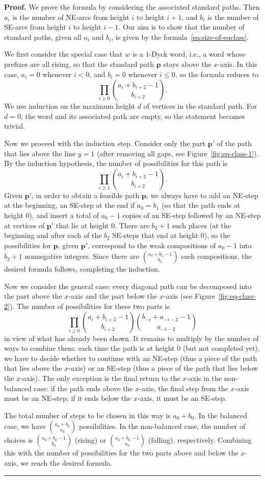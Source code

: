 \documentclass[numbers=enddot,12pt,final,onecolumn,notitlepage]{scrartcl}%
\theoremstyle{definition}
\newenvironment{proof}[1][Proof]{\noindent\textbf{#1.} }{\ \rule{0.5em}{0.5em}}
\newcommand{\pp}{\mathbf{p}}
\begin{document}
\begin{proof}
We prove the formula by considering the associated standard paths. Then $a_i$ is the number of NE-arcs from height $i$ to height $i+1$, and $b_i$ is the number of SE-arcs from height $i$ to height $i-1$. Our aim is to show that the number of standard paths, given all $a_i$ and $b_i$, is given by the formula~\eqref{eq:size-of-eqclass}.

We first consider the special case that $w$ is a $1$-Dyck word, i.e., a word whose prefixes are all rising, so that the standard path $\pp$ stays above the $x$-axis. In this case, $a_i = 0$ whenever $i < 0$, and $b_i = 0$ whenever $i \leq 0$, so the formula reduces to 
\[
\prod_{i \geq 0} \binom{a_i + b_{i+2} - 1}{b_{i+2}}.
\]
We use induction on the maximum height $d$ of vertices in the standard path. For $d=0$, the word and its associated path are empty, so the statement becomes trivial.

Now we proceed with the induction step. Consider only the part $\pp'$ of the path that lies above the line $y=1$ (after removing all gaps, see Figure~\ref{fig:eq-class-1}). By the induction hypothesis, the number of possibilities for this path is
\[
\prod_{i \geq 1} \binom{a_i + b_{i+2} - 1}{b_{i+2}}.
\]
Given $\pp'$, in order to obtain a feasible path $\pp$, we always have to add an NE-step at the beginning, an SE-step at the end if $a_0 = b_1$ (so that the path ends at height $0$), and insert a total of $a_0-1$ copies of an SE-step followed by an NE-step at vertices of $\pp'$ that lie at height $0$. There are $b_2+1$ such places (at the beginning and after each of the $b_2$ SE-steps that end at height $0$), so the possibilities for $\pp$, given $\pp'$, correspond to the weak compositions of $a_0-1$ into $b_2+1$ nonnegative integers. Since there are $\binom{a_0+b_2-1}{b_2}$ such compositions, the desired formula follows, completing the induction.

Now we consider the general case: every diagonal path can be decomposed into the part above the $x$-axis and the part below the $x$-axis (see Figure~\ref{fig:eq-class-2}). The number of possibilities for these two parts is
\[
\prod_{i \geq 0} \binom{a_i + b_{i+2} - 1}{b_{i+2}} \binom{b_{-i} + a_{-i-2} - 1}{a_{-i-2}}
\]
in view of what has already been shown. It remains to multiply by the number of ways to combine them: each time the path is at height $0$ (but not completed yet), we have to decide whether to continue with an NE-step (thus a piece of the path that lies above the $x$-axis) or an SE-step (thus a piece of the path that lies below the $x$-axis). The only exception is the final return to the $x$-axis in the non-balanced case: if the path ends above the $x$-axis, the final step from the $x$-axis must be an NE-step; if it ends below the $x$-axis, it must be an SE-step.

The total number of steps to be chosen in this way is $a_0+b_0$. In the balanced case, we have $\binom{a_0+b_0}{a_0}$ possibilities. In the non-balanced case, the number of choices is $\binom{a_0+b_0-1}{b_0}$ (rising) or $\binom{a_0+b_0-1}{a_0}$ (falling),
respectively. Combining this with the number of possibilities for the two parts above and below the $x$-axis, we reach the desired formula.
\end{proof}
\end{document}
